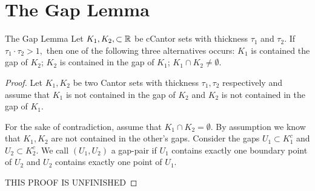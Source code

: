 \section{The Gap Lemma}
\begin{lemma}{The Gap Lemma}\cite{palis&takens}
    Let $K_1, K_2, \subset \mathbb{R}$ be cCantor sets with thickness $\tau_1$ and  $\tau_2$.  If $\tau_1 \cdot \tau_2 >1,$ then one of the following three alternatives occurs: $K_1$ is contained the gap of $K_2$; $K_2$ is contained in the gap of $K_1$; $K_1 \cap K_2 \neq \emptyset.$
\end{lemma}
\begin{proof}
    Let $K_1, K_2$ be two Cantor sets with thickness $\tau_1, \tau_2$ respectively and assume that $K_1$ is not contained in the gap of $K_2$ and $K_2$ is not contained in the gap of $K_1$.  

    For the sake of contradiction, assume that $K_1 \cap K_2 = \emptyset$.  By assumption we know that $K_1, K_2$ are not contained in the other's gaps.  Consider the gaps $U_1 \subset K_1^c$ and $U_2 \subset K_2^c$.  We call $(U_1, U_2)$ a gap-pair if $U_1$ contains exactly one boundary point of $U_2$ and $U_2$ contains exactly one point of $U_1$.  

    THIS PROOF IS UNFINISHED
\end{proof}